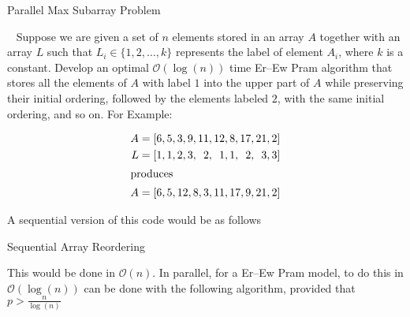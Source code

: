 \documentclass[addpoints]{exam}
\newcommand{\BigO}[1]{\mathcal{O}\left( #1\right)}
\begin{document}
\begin{questions}
\begin{solution}
\begin{algorithm}[H]
\caption{Parallel Max Subarray Problem}
\begin{algorithmic}[1]
\end{algorithmic}
\end{algorithm}
\end{solution}
\ \newpage
{}
Suppose we are given a set of $n$ elements stored in an array $A$ together with an array $L$ such that $L_{i} \in \{1,2,\ldots,k\}$ represents the label of element $A_{i}$, where $k$ is a constant. Develop an optimal $\BigO{\log(n)}$ time {\sc Er--Ew Pram} algorithm that stores all the elements of $A$ with label $1$ into the upper part of $A$ while preserving their initial ordering, followed by the elements labeled $2$, with the same initial ordering, and so on. For Example:

\begin{align*}
A &= \left[ 6, 5, 3, 9, 11, 12, 8, 17, 21, 2\right]\\
L &= \left[ 1, 1, 2, 3, \phantom{1}2, \phantom{1}1, 1, \phantom{1}2, \phantom{1}3, 3\right]\\
\intertext{produces}
A &= \left[ 6,5,12,8,3,11,17,9,21,2 \right]
\end{align*}

\begin{solution}
A sequential version of this code would be as follows

\begin{algorithm}[H]
\caption{Sequential Array Reordering}
\begin{algorithmic}[1]
\ENDFOR
{}
\end{algorithmic}
\end{algorithm}

This would be done in $\BigO{n}$. In parallel, for a {\sc Er--Ew Pram} model, to do this in $\BigO{\log(n)}$ can be done with the following algorithm, provided that $p > \frac{n}{\log (n)}$


\end{solution}
\end{questions}
\end{document}
